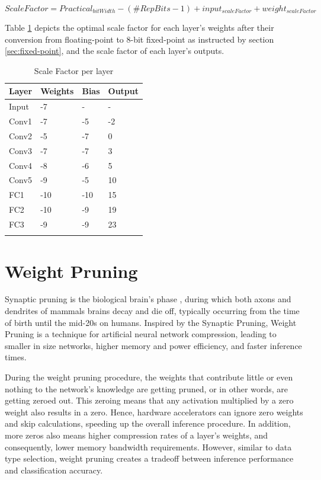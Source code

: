 \begin{equation}
	\label{eqn:activations-scale-factor}
	ScaleFactor = Practical_{bitWidth} - (\#RepBits - 1) + input_{scaleFactor} + weight_{scaleFactor}
\end{equation}

Table \ref{tab:Scale-Factor-per-layer} depicts the optimal scale factor for each layer's weights after their conversion from floating-point to 8-bit fixed-point as instructed by section \ref{sec:fixed-point}, and the scale factor of each layer's outputs.

\begin{table}[H]
	\caption{Scale Factor per layer}
	\label{tab:Scale-Factor-per-layer}
	\centering
	\begin{tabular}{llll}
		\toprule
		\textbf{Layer} & \textbf{Weights} & \textbf{Bias} & \textbf{Output}\\
		\midrule
			Input & -7 & - & -\\
			Conv1 & -7 & -5 & -2\\
			Conv2 & -5 & -7 & 0\\
			Conv3 & -7 & -7 & 3\\
			Conv4 & -8 & -6 & 5\\
			Conv5 & -9 & -5 & 10\\
			FC1 & -10 & -10 & 15\\
			FC2 & -10 & -9 & 19\\
			FC3 & -9 & -9 & 23\\
		\bottomrule\\
	\end{tabular}
\end{table}

\section{Weight Pruning}
Synaptic pruning is the biological brain's phase \cite{Synaptic-Pruning-Wikipedia}, during which both axons and dendrites of mammals brains decay and die off, typically occurring from the time of birth until the mid-20s on humans. Inspired by the Synaptic Pruning, Weight Pruning is a technique for artificial neural network compression, leading to smaller in size networks, higher memory and power efficiency, and faster inference times.

During the weight pruning procedure, the weights that contribute little or even nothing to the network's knowledge are getting pruned, or in other words, are getting zeroed out. This zeroing means that any activation multiplied by a zero weight also results in a zero. Hence, hardware accelerators can ignore zero weights and skip calculations, speeding up the overall inference procedure. In addition, more zeros also means higher compression rates of a layer's weights, and consequently, lower memory bandwidth requirements. However, similar to data type selection, weight pruning creates a tradeoff between inference performance and classification accuracy.

